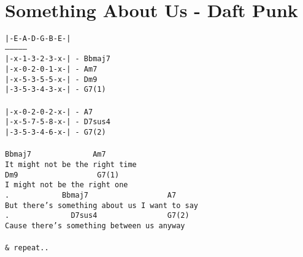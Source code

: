 \newpage
\section{Something About Us - Daft Punk}
\label{Something About Us - Daft Punk}
\texttt{|-E-A-D-G-B-E-|\\
---------------\\
|-x-1-3-2-3-x-| - Bbmaj7\ \\
|-x-0-2-0-1-x-|  - Am7\ \\
|-x-5-3-5-5-x-|  - Dm9\ \\
|-3-5-3-4-3-x-|  - G7(1)\ \\
\\
|-x-0-2-0-2-x-|  - A7\ \\
|-x-5-7-5-8-x-|  - D7sus4\ \\
|-3-5-3-4-6-x-|  - G7(2)\ \\
\\
Bbmaj7\ \ \ \ \ \ \ \ \ \ \ \ \ \ Am7\\
It\ might\ not\ be\ the\ right\ time\\
Dm9\ \ \ \ \ \ \ \ \ \ \ \ \ \ \ \ \ \ G7(1)\ \ \ \ \ \ \ \\
I\ might\ not\ be\ the\ right\ one\\
.\ \ \ \ \ \ \ \ \ \ \ \ Bbmaj7\ \ \ \ \ \ \ \ \ \ \ \ \ \ \ \ \ \ A7\ \ \ \ \ \ \ \ \ \ \\
But\ there's\ something\ about\ us\ I\ want\ to\ say\\
.\ \ \ \ \ \ \ \ \ \ \ \ \ \ D7sus4\ \ \ \ \ \ \ \ \ \ \ \ \ \ \ \ G7(2)\\
Cause\ there's\ something\ between\ us\ anyway\\
\\
\&\ repeat..}
